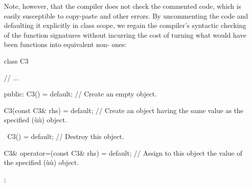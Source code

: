 \noindent Note, however, that the compiler does not check the commented code, which is easily susceptible to copy-paste and other errors. By
uncommenting the code and defaulting it explicitly in class scope, we
regain the compiler's syntactic checking of the function signatures 
without incurring the cost of turning what would have been
 functions into equivalent
non- ones:

\begin{emcppslisting}[language=C++]
class C3
{
     // ...

public:
   C3() = default;
       // Create an empty object.

   C3(const C3& rhs) = default;
       // Create an object having the same value as the specified (ù{}ù) object.

   ~C3() = default;
       // Destroy this object.

   C3& operator=(const C3& rhs) = default;
       // Assign to this object the value of the specified (ù{}ù) object.
};
\end{emcppslisting}
    

